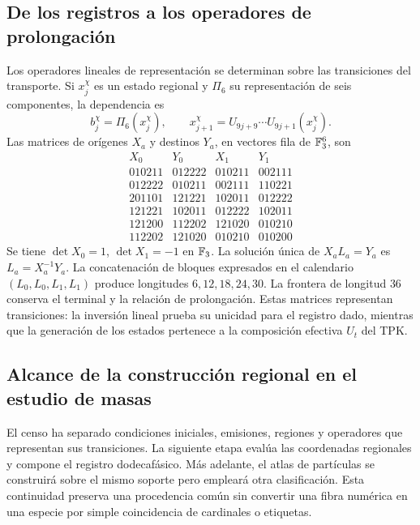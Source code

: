 \subsection{De los registros a los operadores de prolongación}

Los operadores lineales de representación se determinan sobre las
transiciones del transporte. Si \(x_j^\chi\) es un estado regional
y \(\Pi_6\) su representación de seis componentes, la dependencia es
\[
 b_j^\chi=\Pi_6(x_j^\chi),\qquad
 x_{j+1}^\chi=U_{9j+9}\cdots U_{9j+1}(x_j^\chi).
\]
Las matrices de orígenes \(X_a\) y destinos \(Y_a\), en
vectores fila de \(\mathbb F_3^6\), son
\[
\begin{array}{c|c|c|c}
X_0&Y_0&X_1&Y_1\\\hline
010211&012222&010211&002111\\
012222&010211&002111&110221\\
201101&121221&102011&012222\\
121221&102011&012222&102011\\
121200&112202&121020&010210\\
112202&121020&010210&010200
\end{array}
\]
Se tiene \(\det X_0=1\), \(\det X_1=-1\) en \(\mathbb F_3\).
La solución única de \(X_aL_a=Y_a\) es \(L_a=X_a^{-1}Y_a\).
La concatenación de bloques expresados en el calendario
\((L_0,L_0,L_1,L_1)\) produce longitudes
\(6,12,18,24,30\). La frontera de longitud \(36\) conserva
el terminal y la relación de prolongación. Estas matrices
representan transiciones: la inversión lineal prueba su unicidad
para el registro dado, mientras que la generación de los estados
pertenece a la composición efectiva \(U_t\) del TPK.

\subsection{Alcance de la construcción regional en el estudio de masas}

El censo ha separado condiciones iniciales, emisiones, regiones y
operadores que representan sus transiciones. La siguiente etapa
evalúa las coordenadas regionales y compone el registro dodecafásico.
Más adelante, el atlas de partículas se construirá sobre el mismo
soporte pero empleará otra clasificación. Esta continuidad preserva
una procedencia común sin convertir una fibra numérica en una
especie por simple coincidencia de cardinales o etiquetas.
